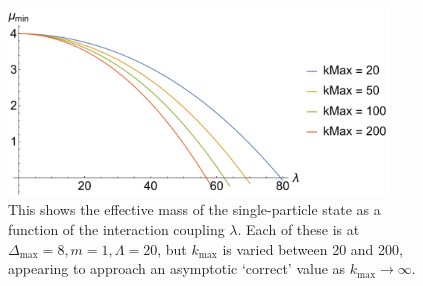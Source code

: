 \begin{figure}
\centering
\includegraphics[width=0.9\textwidth]{truncation_chapter/massgap}	
\caption[Closing of the Ising model mass gap as a function of $\lambda$ for 
    different $k_\mathrm{max}$]{This shows the effective mass of the 
    single-particle state as a function of the interaction coupling $\lambda$. 
    Each of these is at $\Delta_\mathrm{max} = 8, m = 1, \Lambda = 20$, but 
    $k_\mathrm{max}$ is varied between 20 and 200, appearing to approach an 
    asymptotic `correct' value as $k_\mathrm{max} \to \infty$.} 
\label{fig:massgap}
\end{figure}


 

